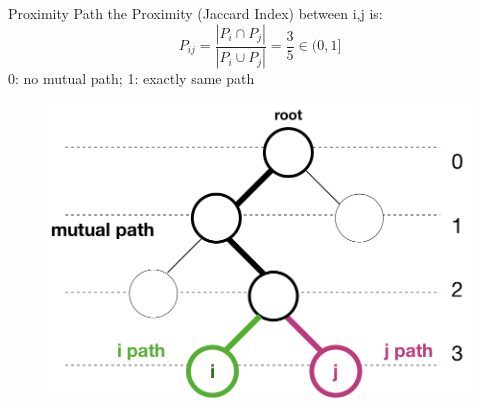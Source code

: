 \documentclass[shortpres]{beamer}
\begin{document}
  \begin{frame}{Proximity Path}	
  the Proximity (Jaccard Index) between i,j is:
  $$P_{ij}=\frac{|P_i \cap P_j|}{|P_i \cup P_j|} = \frac{3}{5}\in (0,1]$$ 0: no mutual path; 1: exactly same path
    \begin{figure}
      \includegraphics[height=0.5\textheight]{fig/ppath3.png}
    \end{figure}
  \end{frame}
\end{document}
